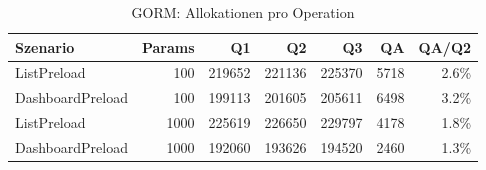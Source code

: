 \begin{table}[ht]
\centering
\caption{GORM: Allokationen pro Operation}
\begin{tabular}{lrrrrrr}
\toprule
Szenario & Params & Q1 & Q2 & Q3 & QA & QA/Q2 \\
\midrule
		ListPreload & 100 & 219652 & 221136 & 225370 & 5718 & 2.6\% \\
		DashboardPreload & 100 & 199113 & 201605 & 205611 & 6498 & 3.2\% \\
		ListPreload & 1000 & 225619 & 226650 & 229797 & 4178 & 1.8\% \\
		DashboardPreload & 1000 & 192060 & 193626 & 194520 & 2460 & 1.3\% \\
\bottomrule
\end{tabular}
\label{tab:benchmark_gorm_allocsperop}
\end{table}
	